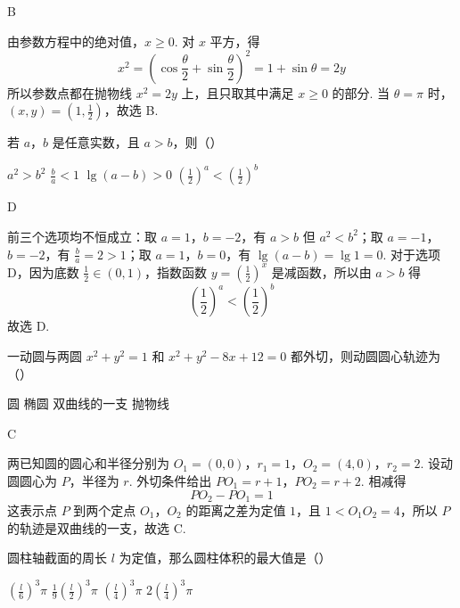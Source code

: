 \begin{answer}
B
\end{answer}

\begin{solution}
由参数方程中的绝对值，\(x\geq0\). 对 \(x\) 平方，得
\[
x^2=\left(\cos\frac\theta2+\sin\frac\theta2\right)^2
=1+\sin\theta=2y
\]
所以参数点都在抛物线 \(x^2=2y\) 上，且只取其中满足 \(x\geq0\) 的部分. 当 \(\theta=\pi\) 时，\((x,y)=(1,\frac12)\)，故选 B.
\end{solution}

\begin{problem}
若 \(a\)，\(b\) 是任意实数，且 \(a>b\)，则（\quad）

\choices
    {\(a^2>b^2\)}
    {\(\frac{b}{a}<1\)}
    {\(\lg(a-b)>0\)}
    {\(\left(\frac{1}{2}\right)^a<\left(\frac{1}{2}\right)^b\)}
\end{problem}

\begin{answer}
D
\end{answer}

\begin{solution}
前三个选项均不恒成立：取 \(a=1\)，\(b=-2\)，有 \(a>b\) 但 \(a^2<b^2\)；取 \(a=-1\)，\(b=-2\)，有 \(\frac{b}{a}=2>1\)；取 \(a=1\)，\(b=0\)，有 \(\lg(a-b)=\lg1=0\). 对于选项 D，因为底数 \(\frac12\in(0,1)\)，指数函数 \(y=\left(\frac12\right)^x\) 是减函数，所以由 \(a>b\) 得
\[
\left(\frac12\right)^a<\left(\frac12\right)^b
\]
故选 D.
\end{solution}

\begin{problem}
一动圆与两圆 \(x^2+y^2=1\) 和 \(x^2+y^2-8x+12=0\) 都外切，则动圆圆心轨迹为（\quad）

\choices
    {圆}
    {椭圆}
    {双曲线的一支}
    {抛物线}
\end{problem}

\begin{answer}
C
\end{answer}

\begin{solution}
两已知圆的圆心和半径分别为
\(O_1=(0,0)\)，\(r_1=1\)，\(O_2=(4,0)\)，\(r_2=2\).
设动圆圆心为 \(P\)，半径为 \(r\). 外切条件给出
\(PO_1=r+1\)，\(PO_2=r+2\).
相减得
\[
PO_2-PO_1=1
\]
这表示点 \(P\) 到两个定点 \(O_1\)，\(O_2\) 的距离之差为定值 \(1\)，且 \(1<O_1O_2=4\)，所以 \(P\) 的轨迹是双曲线的一支，故选 C.
\end{solution}

\begin{problem}
圆柱轴截面的周长 \(l\) 为定值，那么圆柱体积的最大值是（\quad）

\choices
    {\(\left(\frac{l}{6}\right)^3\pi\)}
    {\(\frac{1}{9}\left(\frac{l}{2}\right)^3\pi\)}
    {\(\left(\frac{l}{4}\right)^3\pi\)}
    {\(2\left(\frac{l}{4}\right)^3\pi\)}
\end{problem}

